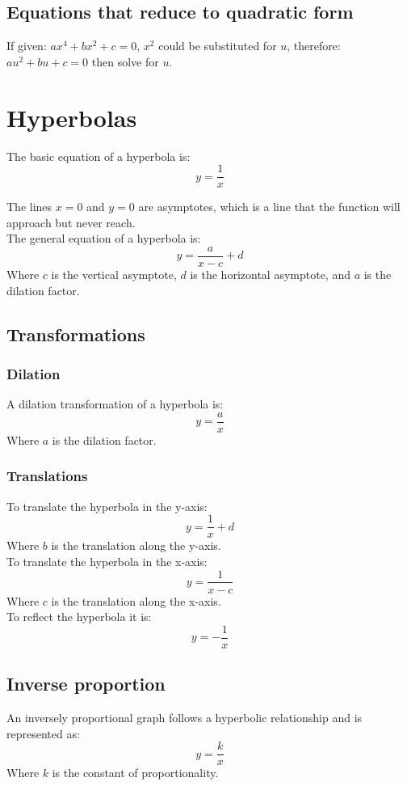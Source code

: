 \documentclass{book}
\begin{document}
\section{Equations that reduce to quadratic form}
If given: $ax^4 + bx^2 + c = 0$, $x^2$ could be substituted for $u$, therefore: $au^2 + bu + c = 0$ then solve for $u$.

\chapter{Hyperbolas}
The basic equation of a hyperbola is:
\[
	y = \frac{1}{x}
\]

The lines $x = 0$ and $y = 0$ are asymptotes, which is a line that the function will approach but never reach.\\

The general equation of a hyperbola is:
\[
	y = \frac{a}{x - c} + d
\]
Where $c$ is the vertical asymptote, $d$ is the horizontal asymptote, and $a$ is the dilation factor.

\section{Transformations}
\subsection{Dilation}
A dilation transformation of a hyperbola is:
\[
	y = \frac{a}{x}
\]
Where $a$ is the dilation factor.

\subsection{Translations}
To translate the hyperbola in the y-axis:
\[
	y = \frac{1}{x} + d
\]
Where $b$ is the translation along the y-axis.\\

To translate the hyperbola in the x-axis:
\[
	y = \frac{1}{x - c}
\]
Where $c$ is the translation along the x-axis.\\

To reflect the hyperbola it is:
\[
	y = -\frac{1}{x}
\]

\section{Inverse proportion}
An inversely proportional graph follows a hyperbolic relationship and is represented as:
\[
	y = \frac{k}{x}
\]
Where $k$ is the constant of proportionality.
\end{document}
